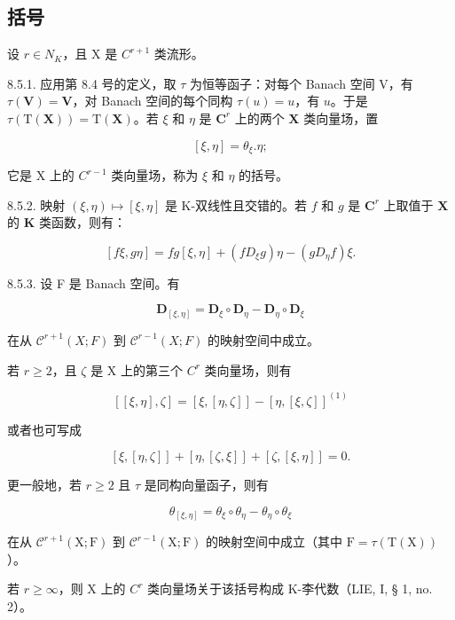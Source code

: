 \subsection{括号}

设 \(r \in N_{K}\)，且 X 是 \(C^{r+1}\) 类流形。

8.5.1. 应用第 8.4 号的定义，取 \(\tau\) 为恒等函子：对每个 Banach 空间 V，有 \(\tau(\mathbf{V}) = \mathbf{V}\)，对 Banach 空间的每个同构 \(\tau(u) = u\)，有 \(u\)。于是 \(\tau(\mathrm{T}(\mathbf{X})) = \mathrm{T}(\mathbf{X})\)。若 \(\xi\) 和 \(\eta\) 是 \(\mathbf{C}^r\) 上的两个 \(\mathbf{X}\) 类向量场，置

\[
[ \xi , \eta ] = \theta_ {\xi}. \eta ;\tag{1}
\]

它是 X 上的 \(C^{r-1}\) 类向量场，称为 \(\xi\) 和 \(\eta\) 的括号。

8.5.2. 映射 \((\xi, \eta) \mapsto [\xi, \eta]\) 是 K-双线性且交错的。若 \(f\) 和 \(g\) 是 \(\mathbf{C}^r\) 上取值于 \(\mathbf{X}\) 的 \(\mathbf{K}\) 类函数，则有：

\[
[ f \xi , g \eta ] = f g [ \xi , \eta ] + (f D _ {\xi} g) \eta - (g D _ {\eta} f) \xi .\tag{2}
\]

8.5.3. 设 F 是 Banach 空间。有

\[
\mathbf {D} _ {[ \xi , \eta ]} = \mathbf {D} _ {\xi} \circ \mathbf {D} _ {\eta} - \mathbf {D} _ {\eta} \circ \mathbf {D} _ {\xi}\tag{3}
\]

在从 \(\mathcal{C}^{r+1}(X;F)\) 到 \(\mathcal{C}^{r-1}(X;F)\) 的映射空间中成立。

若 \(r \geqslant 2\)，且 \(\zeta\) 是 X 上的第三个 \(C^r\) 类向量场，则有

\[
[ [ \xi , \eta ], \zeta ] = [ \xi , [ \eta , \zeta ] ] - [ \eta , [ \xi , \zeta ] ] ^ {(1)}\tag{4}
\]

或者也可写成

\[
[ \xi , [ \eta , \zeta ] ] + [ \eta , [ \zeta , \xi ] ] + [ \zeta , [ \xi , \eta ] ] = 0.
\]

更一般地，若 \(r \geqslant 2\) 且 \(\tau\) 是同构向量函子，则有

\[
\theta_ {[ \xi , \eta ]} = \theta_ {\xi} \circ \theta _ {\eta} - \theta _ {\eta} \circ \theta_ {\xi}\tag{5}
\]

在从 \(\mathcal{C}^{r+1}(\mathrm{X};\mathrm{F})\) 到 \(\mathcal{C}^{r-1}(\mathrm{X};\mathrm{F})\) 的映射空间中成立（其中 \(\mathrm{F} = \tau (\mathrm{T}(\mathrm{X}))\)）。

若 \(r \geqslant \infty\)，则 X 上的 \(C^r\) 类向量场关于该括号构成 K-李代数（LIE, I, § 1, no. 2）。

